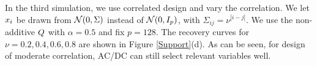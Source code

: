In the third simulation, we use correlated design and vary the correlation. We let
$x_i$ be drawn from $\mathcal{N}(0,\Sigma)$
instead of $\mathcal{N}(0,I_{p})$, with
$\Sigma_{ij}=\nu^{|i-j|}$. We use the non-additive $Q$ with
$\alpha=0.5$ and fix $p=128$.  The recovery curves for $\nu=0.2, 0.4,
0.6, 0.8$ are shown in Figure \ref{Support}(d). As can be seen, for
design of moderate correlation, AC/DC can still select relevant
variables well.





